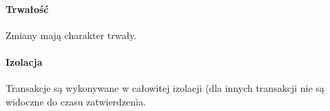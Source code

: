 \documentclass[12pt]{article}
\begin{document}
\paragraph{Trwałość}
Zmiany mają charakter trwały.

\paragraph{Izolacja}
Transakcje są wykonywane w całowitej izolacji (dla innych transakcji nie są widoczne
do czasu zatwierdzenia.

\begin{comment}

Stany transakcji:

 active -> partially commited -> commited
 active -> failed
 partially commited -> failed -> aborted

 Gdy nastąpi awaria, to tranakcja zostaje w stanie dowolnym (!)
 Po restarcie SZBD przegląda niedokończone transakcje i doprowadza je do końca

W jaki sposób zapewnić transakcyjność?

 * shadow database: kopiujemy bazę, i po udanej transakcji usuwamy starą bazę i wskaźnik wskazuje na nową
   (izolacja: po kolei)
   - prosta implementacja
   - nieefektywna (kopiowanie _całej_ bazy danych?!)
   - krótkie transakcje czekają na jedną długą

 * algorytmy zapewniające niepodzielność i trwałość
   Metody pozwalające odtworzyć stan bazy w przypadku awarii, powszechnie stosujemy system logów.
   - awarie transakcji:
    * użytkownik - rollback (jawnie)
    * serwer - na przykład naruszenie warunku integralnościowego
   - awarie aplikacji
    * awaria połączenia itp
   - awarie na poziomie serwera baz danych
    * system crash (utrata danych w pamięci)
    * uszkodzenie dysku (utrata danych na dysku)

   1. Akcje podejmowanie podczas normalnego wykonywania się transkcji
   2. Akcje podejmowane po awarii w celu odtworzenia stanu bazy

   INPUT(X) -- blok z dysku zawierający element X jest kopiowany do pamięci
   READ(X, t) -- jeżeli w pamięci nie ma bloku X, to INPUT(X), następnie t := x
   WRITE(X, t) -- jeżeli bloku zwierającego X nie ma w pamięci to INPUT(X), następnie X := t
   OUTPUT(X) -- zawartość bufora kopiowania na dysk

              | t  | MA | MB | DA | DB | LOG
   READ(A, t) | 8  | 8  |    | 8  | 8  | <START...>
   t := t * 2 | 16 | 8  |    | 8  | 8  |
   WRITE(A, t)| 16 | 16 |    | 8  | 8  |
   READ(B, t) | 8  | 16 | 8  | 8  | 8  |
   t := t * 2 | 16 | 16 | 8  | 8  | 8  |
   WRITE(B, t)| 16 | 16 | 16 | 8  | 8  |
   OUTPUT(A)  | 16 | 16 | 16 | 16 | 8  |
   OUTPUT(B)  | 16 | 16 | 16 | 16 |16  |


\end{comment}
\end{document}
